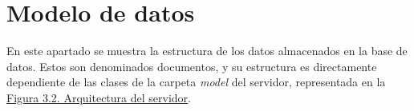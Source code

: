 \section{Modelo de datos}

En este apartado se muestra la estructura de los datos almacenados en la base de datos. Estos son denominados documentos, y su estructura es directamente dependiente de las clases de la carpeta {\it model} del servidor, representada en la \hyperref[enlaceArquitecturaServidor]{Figura 3.2. Arquitectura del servidor}.


